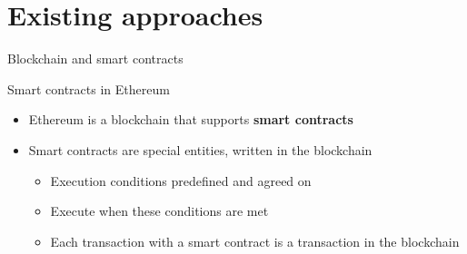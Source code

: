 \section[Possible solutions]{Existing approaches}



\begin{frame}{Blockchain and smart contracts}

	\begin{exampleblock}{Smart contracts in Ethereum}
		\begin{itemize}
			\item Ethereum is a blockchain that supports \textbf{smart contracts}
			\item Smart contracts are special entities, written in the blockchain
			\begin{itemize}
				\item Execution conditions predefined and agreed on 
				\item Execute when these conditions are met
				\item Each transaction with a smart contract is a transaction in the blockchain
			\end{itemize}
		\end{itemize}
	\end{exampleblock}

\end{frame}



